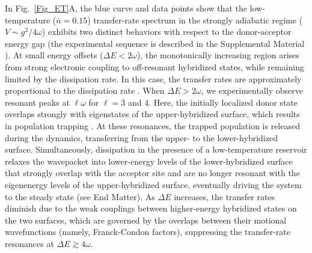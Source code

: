 \documentclass[%
reprint,
superscriptaddress,
amsmath,amssymb,
aps,
prl,
floatfix,
]{revtex4-2}
\begin{document}
In Fig.~\ref{Fig_ET}A, the blue curve and data points show that the low-temperature ($\bar{n}=0.15$) transfer-rate spectrum in the strongly adiabatic regime ($V \sim g^2/4\omega$) exhibits two distinct behaviors with respect to the donor-acceptor energy gap (the experimental sequence is described in the Supplemental Material \cite{so2025fT_supp}). At small energy offsets ($\Delta E < 2\omega$), the monotonically increasing region arises from strong electronic coupling to off-resonant hybridized states, while remaining limited by the dissipation rate. In this case, the transfer rates are approximately proportional to the dissipation rate \cite{schlawin2021electrontransfer,so2024electrontransfer}. When $\Delta E > 2\omega$, we experimentally observe resonant peaks at $\ell\omega$ for $\ell=3$ and 4. Here, the initially localized donor state overlaps strongly with eigenstates of the upper-hybridized surface, which results in population trapping \cite{schlawin2021electrontransfer,so2024electrontransfer,so2025multimode}. At these resonances, the trapped population is released during the dynamics, transferring from the upper- to the lower-hybridized surface. Simultaneously, dissipation in the presence of a low-temperature reservoir relaxes the wavepacket into lower-energy levels of the lower-hybridized surface that strongly overlap with the acceptor site and are no longer resonant with the eigenenergy levels of the upper-hybridized surface, eventually driving the system to the steady state (see End Matter). As $\Delta E$ increases, the transfer rates diminish due to the weak couplings between higher-energy hybridized states on the two surfaces, which are governed by the overlaps between their motional wavefunctions (namely, Franck-Condon factors), suppressing the transfer-rate resonances at $\Delta E \gtrsim 4\omega$.
\end{document}
